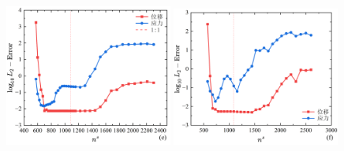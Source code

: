 \begin{figure}[H]
\begin{subcaptiongroup}
    \label{Q4-l2-ns16}
    \end{subcaptiongroup}
    \begin{subcaptiongroup}
    \includegraphics[width=0.49\textwidth]{figures/shearlocking/T3-l2-ns32.png}
    \label{T3-l2-ns32}
    \includegraphics[width=0.49\textwidth]{figures/shearlocking/Q4-l2-ns32.png}
    \label{Q4-l2-ns32}
    \end{subcaptiongroup}
\caption{}
\label{linear-ns}
\end{figure}

